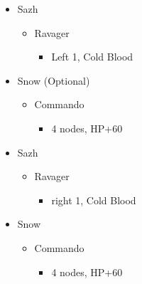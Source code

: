 \begin{paracol}{2}
\begin{menu}
	\begin{itemize}
		\crystarium
		\begin{itemize}
			\item Sazh
			      \begin{itemize}
				      \item Ravager
				            \begin{itemize}
					            \item Left 1, Cold Blood
				            \end{itemize}
			      \end{itemize}
			\item Snow (Optional)
			      \begin{itemize}
				      \item Commando
				            \begin{itemize}
					            \item 4 nodes, HP+60
				            \end{itemize}
			      \end{itemize}
		\end{itemize}
	\end{itemize}
\end{menu}
\switchcolumn
\begin{menu}
\begin{itemize}
    \crystarium
    \begin{itemize}
        \item Sazh
        \begin{itemize}
            \item Ravager
            \begin{itemize}
                \item right 1, Cold Blood
            \end{itemize}
        \end{itemize}
        \item Snow
        \begin{itemize}
            \item Commando
            \begin{itemize}
                \item 4 nodes, HP+60
            \end{itemize}
        \end{itemize}
    \end{itemize}
\end{itemize}
\end{menu}
\switchcolumn*
{}

\end{paracol}

